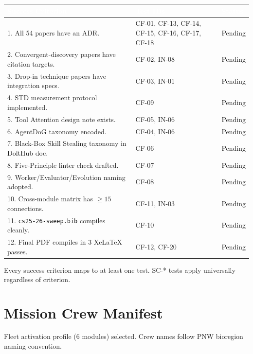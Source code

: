 \documentclass[11pt,letterpaper]{article}
\newcommand{\tableheader}[1]{\textbf{\sffamily\textcolor{white}{#1}}}
\begin{document}
\begin{center}
\begin{tabularx}{\textwidth}{XL{4cm}C{2cm}}
\toprule
{}
\tableheader{Success Criterion} & \tableheader{Test IDs} & \tableheader{Status} \\
. All 54 papers have an ADR. & CF-01, CF-13, CF-14, CF-15, CF-16, CF-17, CF-18 & Pending \\
2. Convergent-discovery papers have citation targets. & CF-02, IN-08 & Pending \\
3. Drop-in technique papers have integration specs. & CF-03, IN-01 & Pending \\
4. STD measurement protocol implemented. & CF-09 & Pending \\
5. Tool Attention design note exists. & CF-05, IN-06 & Pending \\
6. AgentDoG taxonomy encoded. & CF-04, IN-06 & Pending \\
7. Black-Box Skill Stealing taxonomy in DoltHub doc. & CF-06 & Pending \\
8. Five-Principle linter check drafted. & CF-07 & Pending \\
9. Worker/Evaluator/Evolution naming adopted. & CF-08 & Pending \\
10. Cross-module matrix has ${\geq}15$ connections. & CF-11, IN-03 & Pending \\
11. \texttt{cs25-26-sweep.bib} compiles cleanly. & CF-10 & Pending \\
12. Final PDF compiles in 3 XeLaTeX passes. & CF-12, CF-20 & Pending \\
\bottomrule
\end{tabularx}
\end{center}

Every success criterion maps to at least one test. SC-* tests apply universally regardless of criterion.

\section{Mission Crew Manifest}

Fleet activation profile (6 modules) selected. Crew names follow PNW bioregion naming convention.
\end{document}
